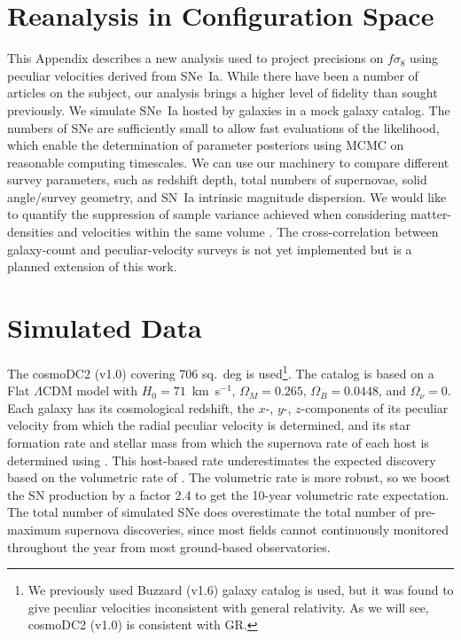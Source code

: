 \documentclass{aastex62}   	%
\begin{document}
\section{Reanalysis in Configuration Space}

This Appendix describes a new analysis used to project precisions on $f\sigma_8$ using peculiar velocities derived from SNe~Ia.
While there have been a number of articles on the subject,
our analysis brings a higher level of fidelity than sought previously.  We simulate SNe~Ia hosted by galaxies in a mock galaxy
catalog. The numbers of SNe are sufficiently small to allow fast evaluations of the likelihood, which enable the determination of parameter
posteriors using MCMC on reasonable computing timescales.   We can use our machinery to 
compare different survey parameters, such as redshift depth, total numbers of supernovae,
solid angle/survey geometry, and SN~Ia intrinsic magnitude dispersion.
We would like to
quantify the suppression of sample variance achieved when considering matter-densities and velocities 
within the same volume \citep{2007PhRvL..99h1301G}.
The cross-correlation between galaxy-count and peculiar-velocity surveys is not yet implemented but is a planned extension of this work.  


\section{Simulated Data}
The cosmoDC2 (v1.0) covering 706 sq.~deg is used\footnote{We previously used
Buzzard (v1.6) galaxy catalog is used, but it was found to give peculiar velocities inconsistent with general relativity.  As we will see,
cosmoDC2 (v1.0) is consistent with GR. }. 
The catalog is based on a Flat $\Lambda$CDM model with $H_0=71$~km~s$^{-1}$,  $\Omega_M=0.265$, $\Omega_B=0.0448$, and
$\Omega_\nu=0$.
Each galaxy has its cosmological redshift, the $x$-, $y$-, $z$-components of its peculiar velocity from which
the radial peculiar velocity is determined, and its
star formation rate and stellar mass from which the
supernova rate of each host is determined using 
\citet{2012ApJ...755...61S}.   This host-based rate
underestimates the expected discovery based on the volumetric
rate of \citet{2010ApJ...713.1026D}.  The volumetric rate is more robust, so  we boost the SN production
by a factor 2.4 to get the 10-year volumetric rate expectation. The total number of simulated SNe 
does overestimate the total number of pre-maximum supernova discoveries, since most fields cannot continuously monitored throughout the year
from most ground-based observatories.
\end{document}
